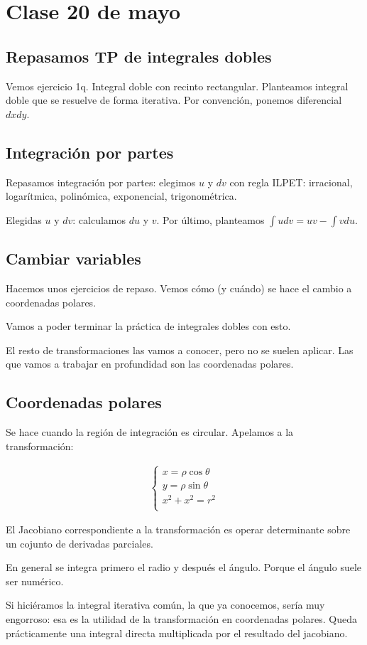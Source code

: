 \section{Clase 20 de mayo}

\subsection{Repasamos TP de integrales dobles}

Vemos ejercicio 1q.
Integral doble con recinto rectangular.
Planteamos integral doble que se resuelve de forma iterativa.
Por convención, ponemos diferencial \(dx dy\).

\subsection{Integración por partes}

Repasamos integración por partes:
elegimos \(u\) y \(dv\) con regla ILPET:
irracional, logarítmica, polinómica, exponencial, trigonométrica.

Elegidas \(u\) y \(dv\):
calculamos \(du\) y \(v\).
Por último, planteamos \(\int udv = uv - \int v du\).

\subsection{Cambiar variables}

Hacemos unos ejercicios de repaso.
Vemos cómo (y cuándo) se hace el cambio a coordenadas polares.

Vamos a poder terminar la práctica de integrales dobles con esto.

El resto de transformaciones las vamos a conocer,
pero no se suelen aplicar.
Las que vamos a trabajar en profundidad son las coordenadas polares.

\subsection{Coordenadas polares}

Se hace cuando la región de integración es circular.
Apelamos a la transformación:

\begin{align*}
    \begin{cases}
        x = \rho\cos\theta    \\
        y = \rho\sin\theta    \\
        x^{2} + x^{2} = r^{2} \\
    \end{cases}
\end{align*}

El Jacobiano correspondiente a la transformación es operar determinante sobre un cojunto de derivadas parciales.

En general se integra primero el radio y después el ángulo.
Porque el ángulo suele ser numérico.

Si hiciéramos la integral iterativa común,
la que ya conocemos,
sería muy engorroso:
esa es la utilidad de la transformación en coordenadas polares.
Queda prácticamente una integral directa multiplicada por el resultado del jacobiano.
